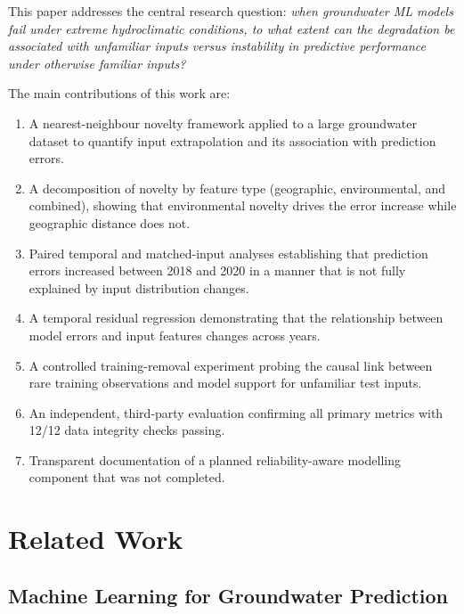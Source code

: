 \documentclass[conference]{IEEEtran}
\begin{document}
This paper addresses the central research question: \emph{when groundwater
ML models fail under extreme hydroclimatic conditions, to what extent can
the degradation be associated with unfamiliar inputs versus instability in
predictive performance under otherwise familiar inputs?}

The main contributions of this work are:
\begin{enumerate}
  \item A nearest-neighbour novelty framework applied to a large
        groundwater dataset to quantify input extrapolation and its
        association with prediction errors.
  \item A decomposition of novelty by feature type (geographic,
        environmental, and combined), showing that environmental novelty
        drives the error increase while geographic distance does not.
  \item Paired temporal and matched-input analyses establishing that
        prediction errors increased between 2018 and 2020 in a manner
        that is not fully explained by input distribution changes.
  \item A temporal residual regression demonstrating that the
        relationship between model errors and input features changes
        across years.
  \item A controlled training-removal experiment probing the causal
        link between rare training observations and model support for
        unfamiliar test inputs.
  \item An independent, third-party evaluation confirming all primary
        metrics with 12/12 data integrity checks passing.
  \item Transparent documentation of a planned reliability-aware
        modelling component that was not completed.
\end{enumerate}

\section{Related Work}
\label{sec:related}

\subsection{Machine Learning for Groundwater Prediction}
\end{document}
